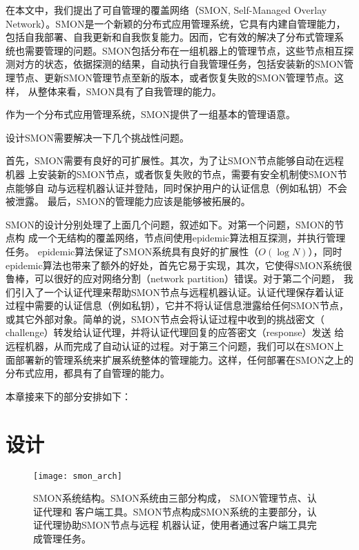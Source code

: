 在本文中，我们提出了可自管理的覆盖网络（SMON, Self-Managed Overlay
Network）。SMON是一个新颖的分布式应用管理系统，它具有内建自管理能力，
包括自我部署、自我更新和自我恢复能力。因而，它有效的解决了分布式管理系
统也需要管理的问题。SMON包括分布在一组机器上的管理节点，这些节点相互探
测对方的状态，依据探测的结果，自动执行自我管理任务，包括安装新的SMON管
理节点、更新SMON管理节点至新的版本，或者恢复失败的SMON管理节点。这样，
从整体来看，SMON具有了自我管理的能力。

作为一个分布式应用管理系统，SMON提供了一组基本的管理语意。

设计SMON需要解决一下几个挑战性问题。

首先，SMON需要有良好的可扩展性。其次，为了让SMON节点能够自动在远程机器
上安装新的SMON节点，或者恢复失败的节点，需要有安全机制使SMON节点能够自
动与远程机器认证并登陆，同时保护用户的认证信息（例如私钥）不会被泄露。
最后，SMON的管理能力应该是能够被拓展的。

SMON的设计分别处理了上面几个问题，叙述如下。对第一个问题，SMON的节点构
成一个无结构的覆盖网络，节点间使用epidemic算法相互探测，并执行管理任务。
epidemic算法保证了SMON系统具有良好的扩展性（$O(\log N)$），同时
epidemic算法也带来了额外的好处，首先它易于实现，其次，它使得SMON系统很
鲁棒，可以很好的应对网络分割（network partition）错误。对于第二个问题，
我们引入了一个认证代理来帮助SMON节点与远程机器认证。认证代理保存着认证
过程中需要的认证信息（例如私钥），它并不将认证信息泄露给任何SMON节点，
或其它外部对象。简单的说，SMON节点会将认证过程中收到的挑战密文（
challenge）转发给认证代理，并将认证代理回复的应答密文（response）发送
给远程机器，从而完成了自动认证的过程。对于第三个问题，我们可以在SMON上
面部署新的管理系统来扩展系统整体的管理能力。这样，任何部署在SMON之上的
分布式应用，都具有了自管理的能力。

本章接来下的部分安排如下：

\section{设计}

\begin{figure}
  \centering
  \begin{minipage}{0.8\linewidth}
    \centering
    \texttt{[image: smon\_arch]}
    \caption[SMON系统结构]{SMON系统结构。SMON系统由三部分构成，
    SMON管理节点、认证代理和
    客户端工具。SMON节点构成SMON系统的主要部分，认证代理协助SMON节点与远程
    机器认证，使用者通过客户端工具完成管理任务。}
    \label{fig:smon_arch}
  \end{minipage}
\end{figure}

